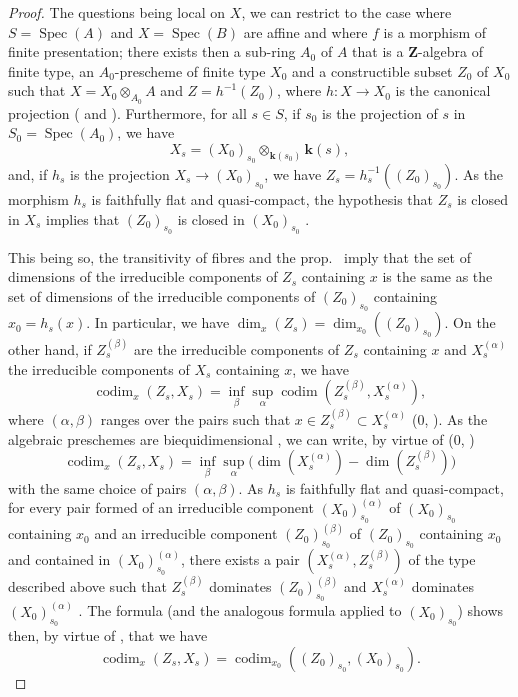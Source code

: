 \begin{proof}
\label{IV.9.9.1-proof}
The questions being local on $X$, we can restrict to the case where $S=\operatorname{Spec}(A)$ and $X=\operatorname{Spec}(B)$ are affine and where $f$ is a morphism of finite presentation; there exists then a sub-ring $A_0$ of $A$ that is a $\mathbf{Z}$-algebra of finite type, an $A_0$-prescheme of finite type $X_0$ and a constructible subset $Z_0$ of $X_0$ such that $X=X_0\otimes_{A_0}A$ and $Z=h^{-1}(Z_0)$, where $h:X\to X_0$ is the canonical projection ( and ).
Furthermore, for all $s\in S$, if $s_0$ is the projection of $s$ in $S_0=\operatorname{Spec}(A_0)$, we have
\[
  X_s=(X_0)_{s_0}\otimes_{\mathbf{k}(s_0)}\mathbf{k}(s),
\]
and, if $h_s$ is the projection $X_s\to(X_0)_{s_0}$, we have $Z_s=h_s^{-1}((Z_0)_{s_0})$.
As the morphism $h_s$ is faithfully flat and quasi-compact, the hypothesis that $Z_s$ is closed in $X_s$ implies that $(Z_0)_{s_0}$ is closed in $(X_0)_{s_0}$ .

This being so, the transitivity of fibres  and the prop.~ imply that the set of dimensions of the irreducible components of $Z_s$ containing $x$ is the same as the set of dimensions of the irreducible components of $(Z_0)_{s_0}$ containing $x_0=h_s(x)$.
In particular, we have $\dim_x(Z_s)=\dim_{x_0}((Z_0)_{s_0})$.
On the other hand, if $Z_s^{(\beta)}$ are the irreducible components of $Z_s$ containing $x$ and $X_s^{(\alpha)}$ the irreducible components of $X_s$
containing $x$, we have
\[
  \operatorname{codim}_x(Z_s,X_s)
  =\inf_{\beta}\sup_{\alpha}\operatorname{codim}(Z_s^{(\beta)},X_s^{(\alpha)}),
\]
where $(\alpha,\beta)$ ranges over the pairs such that $x\in Z_s^{(\beta)}\subset X_s^{(\alpha)}$ ($0$, ).
As the algebraic preschemes are biequidimensional , we can write, by virtue of ($0$, )
\begin{equation}
\tag{9.9.1.1}
\label{IV.9.9.1.1}
  \operatorname{codim}_x(Z_s,X_s)=\inf_{\beta}\sup_{\alpha}\bigl(\dim(X_s^{(\alpha)})-\dim(Z_s^{(\beta)})\bigr)
\end{equation}
with the same choice of pairs $(\alpha,\beta)$.
As $h_s$ is faithfully flat and quasi-compact, for every pair formed of an irreducible component $(X_0)_{s_0}^{(\alpha)}$ of $(X_0)_{s_0}$ containing $x_0$ and an irreducible component $(Z_0)_{s_0}^{(\beta)}$ of $(Z_0)_{s_0}$ containing $x_0$ and contained in $(X_0)_{s_0}^{(\alpha)}$, there exists a pair $(X_s^{(\alpha)},Z_s^{(\beta)})$ of the type described above such that $Z_s^{(\beta)}$ dominates $(Z_0)_{s_0}^{(\beta)}$ and $X_s^{(\alpha)}$ dominates $(X_0)_{s_0}^{(\alpha)}$ .
The formula  (and the analogous formula applied to $(X_0)_{s_0}$) shows then, by virtue of , that we have
\[
  \operatorname{codim}_x(Z_s,X_s)=\operatorname{codim}_{x_0}((Z_0)_{s_0},(X_0)_{s_0}).
\]


\end{proof}
